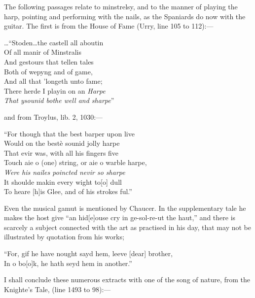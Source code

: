 The following passages relate to minstrelsy, and to the manner of playing the
harp, pointing and performing with the nails, as the Spaniards do now with the
guitar. The first is from the House of Fame (Urry, line 105 to 112):—
\begin{scverse}
\ldots “Stoden\ldots the castell all aboutin\\
Of all manir of Minstralis\\
And gestours that tellen tales\\
Both of wepyng and of game,\\
And all that ’longeth unto fame;\\
There herde I playin on an \textit{Harpe}\\
\textit{That ysounid bothe well and sharpe}”
\end{scverse}
and from Troylus, lib. 2, 1030:—
\begin{scverse}
“For though that the best barper upon live\\
Would on the bestè sounid jolly harpe\\
That evir was, with all his fingers five\\
Touch aie o (one) string, or aie o warble harpe,\\
\textit{Were his nailes poincted nevir so sharpe}\\
It shoulde makin every wight to[o] dull\\
To heare [h]is Glee, and of his strokes ful.”
\end{scverse}

Even the musical gamut is mentioned by Chaucer. In the supplementary tale
he makes the host give “an hid[e]ouse cry in ge-sol-re-ut the haut,” and there is
scarcely a subject connected with the art as practised in his day, that may not be
illustrated by quotation from his works;
\begin{scverse}
“For, gif he have nought sayd hem, leeve [dear] brother,\\
In o bo[o]k, he hath seyd hem in another.”
\end{scverse}

\pagebreak
{}

I shall conclude these numerous extracts with one of the song of nature, from
the Knighte’s Tale, (line 1493 to 98):—

